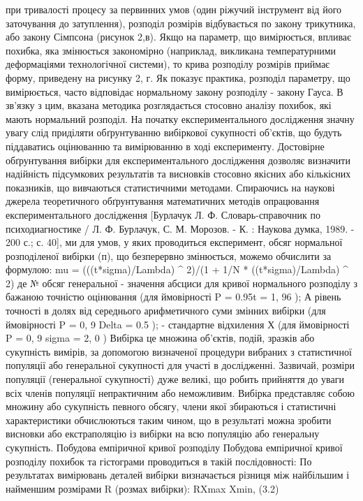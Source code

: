 при тривалості процесу за первинних умов (один ріжучий інструмент від його
заточування до затуплення), розподіл розмірів відбувається по закону
трикутника, або закону Сімпсона (рисунок 2,в).
Якщо на параметр, що вимірюється, впливає похибка, яка змінюється
закономірно (наприклад, викликана температурними деформаціями
технологічної системи), то крива розподілу розмірів приймає форму, приведену
на рисунку 2, г.
Як показує практика, розподіл параметру, що вимірюється, часто
відповідає нормальному закону розподілу - закону Гауса. В зв'язку з цим,
вказана методика розглядається стосовно аналізу похибок, які мають
нормальний розподіл.
На початку експериментального дослідження значну увагу слід приділяти
обґрунтуванню вибіркової сукупності об'єктів, що будуть піддаватись
оцінюванню та вимірюванню в ході експерименту.
Достовірне обґрунтування вибірки для експериментального дослідження
дозволяє визначити надійність підсумкових результатів та висновків стосовно
якісних або кількісних показників, що вивчаються статистичними методами.
Спираючись на наукові джерела теоретичного обґрунтування
математичних методів опрацювання експериментального дослідження
[Бурлачук Л. Ф. Словарь-справочник по психодиагностике / Л. Ф. Бурлачук,
С. М. Морозов. - К. : Наукова думка, 1989. - 200 с.; с. 40], ми для умов, у яких
проводиться експеримент, обсяг нормальної розподіленої вибірки (п), що безперервно змінюється, можемо обчислити за формулою:
mu = (((t*sigma)/Lambda) ^ 2)/(1 + 1/N * ((t*sigma)/Lambda) ^ 2)
де № обсяг генеральної
- значення абсциси для кривої нормального розподілу з бажаною точністю оцінювання (для ймовірності P = 0.95t = 1, 96 );
А рівень точності в долях від середнього арифметичного суми змінних
вибірки (для ймовірності P = 0, 9 Delta = 0.5 );
- стандартне відхилення Х (для ймовірності P = 0, 9 sigma = 2, 0 )
Вибірка це множина об'єктів, подій, зразків або сукупність вимірів, за допомогою визначеної процедури вибраних з статистичної популяції або генеральної сукупності для участі в дослідженні. Зазвичай, розміри популяції (генеральної сукупності) дуже великі, що робить прийняття до уваги всіх членів популяції непрактичним або неможливим. Вибірка представляє собою множину або сукупність певного обсягу, члени якої збираються і статистичні характеристики обчислюються таким чином, що в результаті можна зробити висновки або екстраполяцію із вибірки на всю популяцію або генеральну сукупність.
Побудова емпіричної кривої розподілу
Побудова емпіричної кривої розподілу похибок та гістограми
проводиться в такій послідовності:
По результатах вимірювань деталей вибірки визначається різниця між найбільшим і найменшим розмірами R (розмах вибірки): RXmax Xmin, (3.2)
